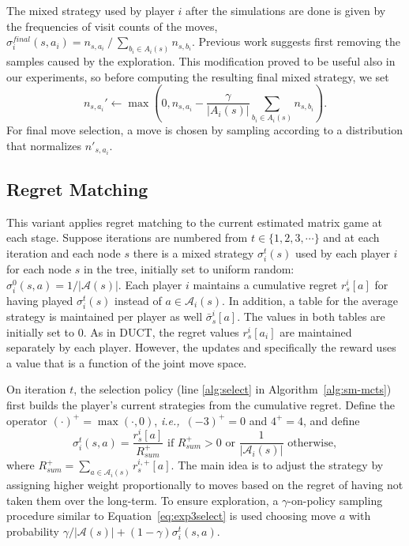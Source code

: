 \documentclass[conference]{IEEEtran}
\newcommand{\cA}{\mathcal{A}}
\newcommand{\ie}{{\it i.e.,}~}
\begin{document}
The mixed strategy used by player $i$ after the simulations are done is given by the frequencies of visit counts of the moves, 
$\sigma^{final}_i(s,a_i) =  n_{s,a_i}~/~\sum_{b_i\in A_i(s)} n_{s,b_i}$.
Previous work \cite{Teytaud11Upper} suggests first removing the samples caused by the exploration. This modification proved to be useful also in our experiments, so before computing the resulting final mixed strategy, we set
\begin{equation}
n_{s,a_i}' \leftarrow \max\left(0,n_{s,a_i} - \frac{\gamma}{|A_i(s)|}\sum_{b_i\in A_i(s)}n_{s,b_i}\right).
\end{equation}
For final move selection, a move is chosen by sampling according to a distribution that normalizes $n'_{s,a_i}$. 

\subsection{Regret Matching}

This variant applies regret matching \cite{Hart00} to the current estimated matrix game at each stage. 
Suppose iterations are numbered from $t \in \{ 1, 2, 3, \cdots \}$ and at each iteration and each node $s$ 
there is a mixed strategy $\sigma_i^t(s)$ used by each player $i$ for each node $s$ in the tree, initially set to 
uniform random: $\sigma^0_i(s,a) = 1 / |\cA(s)|$. 
Each player $i$ maintains a cumulative regret $r^i_s[a]$ for having played $\sigma_i^t(s)$ instead of $a \in \cA_i(s)$. 
In addition, a table for the average strategy is maintained per player as well $\bar{\sigma}^i_s[a]$. The values in 
both tables are initially set to 0. 
As in DUCT, the regret values $r^i_s[a_i]$ are maintained separately by each player.
However, the updates and specifically the reward uses a value that is a function of the joint move space. 

On iteration $t$, the selection policy (line \ref{alg:select} in Algorithm~\ref{alg:sm-mcts}) first builds 
the player's current strategies from the cumulative regret. Define the operator $(\cdot)^+ = \max(\cdot,0)$, 
\ie $(-3)^+ = 0$ and $4^+ = 4$, and define
\begin{equation}
\label{eq:rm}
\sigma^t_i(s,a) = \frac{r^i_s[a]}{R^+_{sum}} \mbox{ if } R^+_{sum} > 0 \mbox{ or } 
\frac{1}{|\cA_i(s)|} \mbox{ otherwise},
\end{equation}
where $R^+_{sum} = \sum_{a \in \cA_i(s)}{r^{i,+}_s[a]}$. 
The main idea is to adjust the strategy by assigning higher weight proportionally to moves based on the regret of 
having not taken them over the long-term. 
To ensure exploration, a $\gamma$-on-policy sampling procedure similar to Equation~\ref{eq:exp3select} is used 
choosing move $a$ with probability $\gamma/|\cA(s)| + (1-\gamma) \sigma^t_i(s,a)$. 
\end{document}
